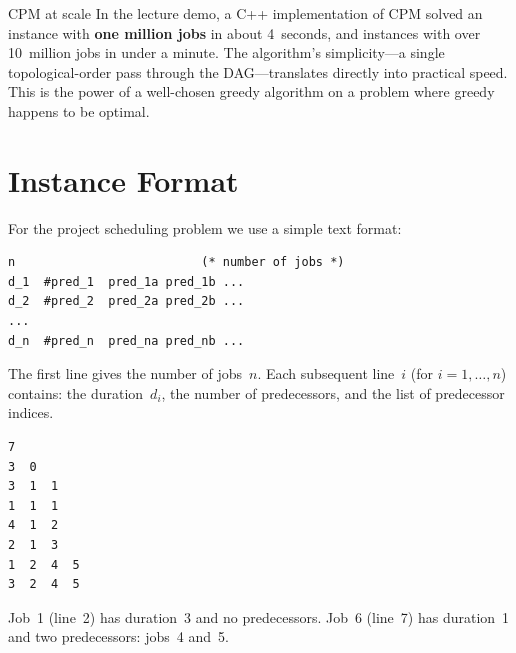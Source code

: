 \begin{intermezzo}{CPM at scale}
In the lecture demo, a C++ implementation of CPM solved an
instance with \textbf{one million jobs} in about 4~seconds, and
instances with over 10~million jobs in under a minute.
The algorithm's simplicity---a single topological-order pass
through the DAG---translates directly into practical speed.
This is the power of a well-chosen greedy algorithm on a problem
where greedy happens to be optimal.
\end{intermezzo}


\section{Instance Format}
\label{sec:instance-format}

For the project scheduling problem we use a simple text format:%

\begin{lstlisting}[language={}, caption={Instance file format
  for project scheduling.}, label={lst:ps-format}]
n                          (* number of jobs *)
d_1  #pred_1  pred_1a pred_1b ...
d_2  #pred_2  pred_2a pred_2b ...
...
d_n  #pred_n  pred_na pred_nb ...
\end{lstlisting}

\noindent
The first line gives the number of jobs~$n$.
Each subsequent line~$i$ (for $i = 1, \dots, n$) contains:
the duration~$d_i$, the number of predecessors, and the list of
predecessor indices.

\begin{example}
\label{ex:instance-file}
\begin{lstlisting}[language={}, numbers=none]
7
3  0
3  1  1
1  1  1
4  1  2
2  1  3
1  2  4  5
3  2  4  5
\end{lstlisting}
Job~1 (line~2) has duration~3 and no predecessors.
Job~6 (line~7) has duration~1 and two predecessors: jobs~4 and~5.
\end{example}
